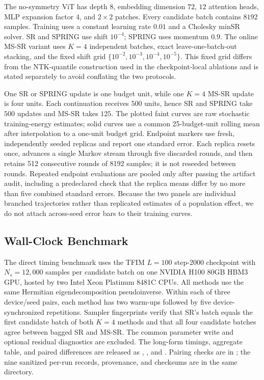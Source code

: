 

The no-symmetry ViT has depth $8$, embedding dimension $72$, $12$ attention
heads, MLP expansion factor $4$, and $2\times2$ patches. Every candidate batch
contains $8192$ samples. Training uses a constant learning rate $0.01$ and a
Cholesky minSR solver. SR and SPRING use shift $10^{-4}$; SPRING uses momentum
$0.9$. The online MS-SR variant uses $K=4$ independent batches, exact
leave-one-batch-out stacking, and the fixed shift grid
$\{10^{-2},10^{-3},10^{-4},10^{-5}\}$. This fixed grid differs from the
NTK-quantile construction used in the checkpoint-local ablations and is stated
separately to avoid conflating the two protocols.

One SR or SPRING update is one budget unit, while one $K=4$ MS-SR update is
four units. Each continuation receives $500$ units, hence SR and SPRING take
$500$ updates and MS-SR takes $125$. The plotted faint curves are raw
stochastic training-energy estimates; solid curves use a common 25-budget-unit
rolling mean after interpolation to a one-unit budget grid. Endpoint markers use fresh,
independently seeded replicas and report one standard error. Each replica resets
once, advances a single Markov stream through five discarded rounds, and then
retains 512 consecutive rounds of 8192 samples; it is not reseeded between
rounds. Repeated endpoint evaluations are pooled only after passing the
artifact audit, including a predeclared check that the replica means differ by
no more than five combined standard errors. Because the two
panels are individual branched trajectories rather than replicated estimates
of a population effect, we do not attach across-seed error bars to their
training curves.

\subsection{Wall-Clock Benchmark}\label{app:mssr_cost}

The direct timing benchmark uses the TFIM $L=100$ step-2000 checkpoint with
$N_s=12{,}000$ samples per candidate batch on one NVIDIA H100 80GB HBM3 GPU,
hosted by two Intel Xeon Platinum 8481C CPUs. All methods use the same Hermitian
eigendecomposition pseudoinverse. Within each of three device/seed pairs, each
method has two warm-ups followed by five device-synchronized repetitions.
Sampler fingerprints verify that SR's batch equals the first candidate batch
of both $K=4$ methods and that all four candidate batches agree between bagged
SR and MS-SR. The common parameter write and optional residual diagnostics are
excluded.
The long-form timings, aggregate table, and paired differences are released as
,
, and
. Pairing checks are in
; the nine sanitized
per-run records, provenance, and checksums are in the same
 directory.

